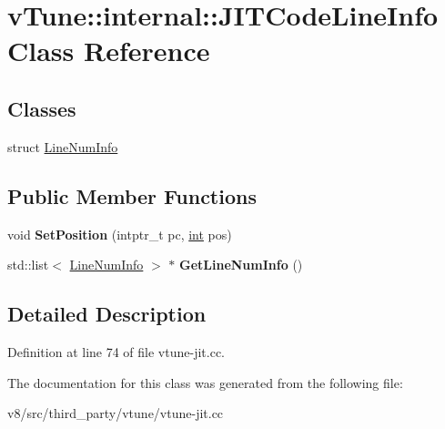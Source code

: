 \hypertarget{classvTune_1_1internal_1_1JITCodeLineInfo}{}\section{v\+Tune\+:\+:internal\+:\+:J\+I\+T\+Code\+Line\+Info Class Reference}
\label{classvTune_1_1internal_1_1JITCodeLineInfo}
\subsection*{Classes}
\begin{DoxyCompactItemize}
\item 
struct \mbox{\hyperlink{structvTune_1_1internal_1_1JITCodeLineInfo_1_1LineNumInfo}{Line\+Num\+Info}}
\end{DoxyCompactItemize}
\subsection*{Public Member Functions}
\begin{DoxyCompactItemize}
\item 
\mbox{\label{classvTune_1_1internal_1_1JITCodeLineInfo_a2de941005e294c882d2b6a611f6c888a}} 
void {\bfseries Set\+Position} (intptr\+\_\+t pc, \mbox{\hyperlink{classint}{int}} pos)
\item 
\mbox{\label{classvTune_1_1internal_1_1JITCodeLineInfo_ac93412d598d5738a5154af6140e0b638}} 
std\+::list$<$ \mbox{\hyperlink{structvTune_1_1internal_1_1JITCodeLineInfo_1_1LineNumInfo}{Line\+Num\+Info}} $>$ $\ast$ {\bfseries Get\+Line\+Num\+Info} ()
\end{DoxyCompactItemize}


\subsection{Detailed Description}


Definition at line 74 of file vtune-\/jit.\+cc.



The documentation for this class was generated from the following file\+:\begin{DoxyCompactItemize}
\item 
v8/src/third\+\_\+party/vtune/vtune-\/jit.\+cc\end{DoxyCompactItemize}
